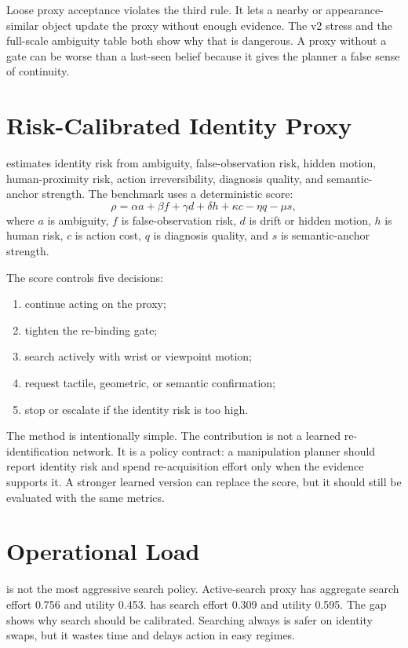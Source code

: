 Loose proxy acceptance violates the third rule. It lets a nearby or appearance-similar object update the proxy without enough evidence. The v2 stress and the full-scale ambiguity table both show why that is dangerous. A proxy without a gate can be worse than a last-seen belief because it gives the planner a false sense of continuity.

\section{Risk-Calibrated Identity Proxy}

\method estimates identity risk from ambiguity, false-observation risk, hidden motion, human-proximity risk, action irreversibility, diagnosis quality, and semantic-anchor strength. The benchmark uses a deterministic score:
\[
\rho = \alpha a + \beta f + \gamma d + \delta h + \kappa c - \eta q - \mu s,
\]
where $a$ is ambiguity, $f$ is false-observation risk, $d$ is drift or hidden motion, $h$ is human risk, $c$ is action cost, $q$ is diagnosis quality, and $s$ is semantic-anchor strength.

The score controls five decisions:
\begin{enumerate}[leftmargin=*]
\item continue acting on the proxy;
\item tighten the re-binding gate;
\item search actively with wrist or viewpoint motion;
\item request tactile, geometric, or semantic confirmation;
\item stop or escalate if the identity risk is too high.
\end{enumerate}

The method is intentionally simple. The contribution is not a learned re-identification network. It is a policy contract: a manipulation planner should report identity risk and spend re-acquisition effort only when the evidence supports it. A stronger learned version can replace the score, but it should still be evaluated with the same metrics.

\section{Operational Load}

\method is not the most aggressive search policy. Active-search proxy has aggregate search effort 0.756 and utility 0.453. \method has search effort 0.309 and utility 0.595. The gap shows why search should be calibrated. Searching always is safer on identity swaps, but it wastes time and delays action in easy regimes.

